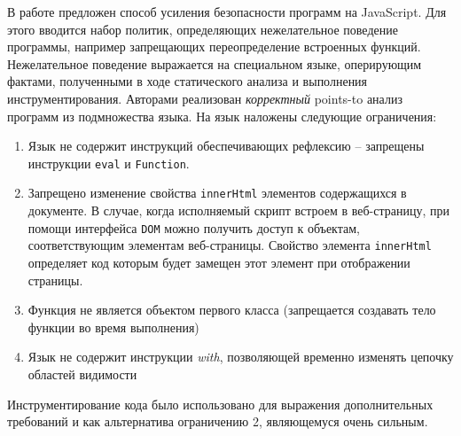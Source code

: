 В работе \cite{guarnieri2009gatekeeper} предложен способ усиления
безопасности программ на JavaScript. Для этого вводится набор политик,
определяющих нежелательное поведение программы, например запрещающих
переопределение встроенных функций. Нежелательное поведение выражается
на специальном языке, оперирующим фактами, полученными в ходе
статического анализа и выполнения инструментирования. Авторами
реализован \emph{корректный} points-to анализ программ из подмножества
языка. На язык наложены следующие ограничения:
\begin{enumerate}
  \item 
    Язык не содержит инструкций обеспечивающих рефлексию -- запрещены
    инструкции \texttt{eval} и \texttt{Function}.
  \item 
    Запрещено изменение свойства \texttt{innerHtml} элементов
    содержащихся в документе. В случае, когда исполняемый скрипт
    встроем в веб-страницу, при помощи интерфейса \texttt{DOM} можно
    получить доступ к объектам, соответствующим элементам
    веб-страницы. Свойство элемента \texttt{innerHtml} определяет код
    которым будет замещен этот элемент при отображении страницы. 
  \item 
    Функция не является объектом первого класса (запрещается создавать
    тело функции во время выполнения)
  \item	
    Язык не содержит инструкции \emph{with}, позволяющей временно
    изменять цепочку областей видимости
\end{enumerate}
Инструментирование кода было использовано для выражения дополнительных
требований и как альтернатива ограничению 2, являющемуся очень
сильным.
